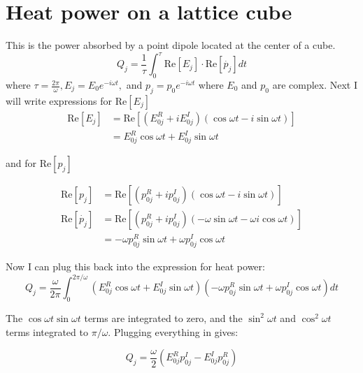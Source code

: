 \documentclass[12pt]{article}
\begin{document}
\section{Heat power on a lattice cube}
This is the power absorbed by a point dipole located at the center of a cube. 
\begin{equation}
Q_j = \frac{1}{\tau} \int_0^\tau \textrm{Re}[E_j] \cdot \textrm{Re}[\dot{p_j}] dt
\end{equation}
where $\tau = \frac{2 \pi}{\omega}, E_j = E_0 e^{-i \omega t}, $ and $ p_j = p_0 e^{-i \omega t} $ where $E_0$ and $p_0$ are complex. Next I will write expressions for $\textrm{Re}[E_j]$
\begin{equation}
\begin{split}
\textrm{Re}[E_j] &= \textrm{Re} \left [(E_{0j}^R + i E_{0j}^I)(\cos{\omega t} - i \sin{\omega t}) \right ] \\ 
&= E_{0j}^R \cos \omega t + E_{0j}^I \sin \omega t 
\end{split}
\end{equation}

and for $\textrm{Re}[{p}_j]$

\begin{equation}
\begin{split}
\textrm{Re}[p_j] &= \textrm{Re} \left [(p_{0j}^R + i p_{0j}^I)(\cos{\omega t} - i \sin{\omega t}) \right ] \\
\textrm{Re}[\dot{p_j}] &= \textrm{Re} \left [(p_{0j}^R + i p_{0j}^I)(-\omega \sin \omega t - \omega i \cos \omega t) \right ] \\ 
&= -\omega p_{0j}^R \sin \omega t + \omega p_{0j}^I \cos \omega t
\end{split}
\end{equation}

Now I can plug this back into the expression for heat power: 
\begin{equation}
Q_j = \frac{\omega}{2 \pi} \int_0^{2 \pi / \omega} \left ( E_{0j}^R \cos \omega t + E_{0j}^I \sin \omega t \right ) \left(-\omega p_{0j}^R \sin \omega t + \omega p_{0j}^I \cos \omega t \right)  dt 
\end{equation}

The $\cos \omega t \sin \omega t $ terms are integrated to zero, and the $ \sin^2{\omega t}$ and $ \cos^2{\omega t}$ terms integrated to $\pi/\omega $. Plugging everything in gives: 

\begin{equation}
Q_j = \frac{\omega}{2} \left ( E_{0j}^R  p_{0j}^I  -  E_{0j}^I  p_{0j}^R  \right)  
\end{equation}
\end{document}
